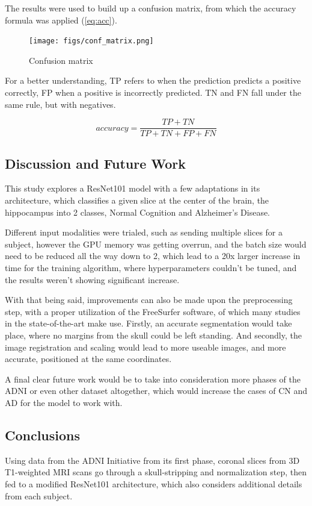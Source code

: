 \documentclass[a4paper, 12pt]{article}
\begin{document}
The results were used to build up a confusion matrix, from which the accuracy formula was applied (\ref{eq:acc}).
\begin{figure}[htbp]
    \centering
    \texttt{[image: figs/conf\_matrix.png]}
    \caption{Confusion matrix}
    \label{fig:confusion matrix}
\end{figure}

For a better understanding, TP refers to when the prediction predicts a positive correctly, FP when a positive is incorrectly
predicted. TN and FN fall under the same rule, but with negatives.

\begin{equation}
    accuracy = \frac{TP + TN}{TP + TN + FP + FN}
    \label{eq:acc}
\end{equation}

\newpage
\subsection{Discussion and Future Work}
This study explores a ResNet101 model with a few adaptations in its architecture, which classifies a given slice at the center of the brain,
the hippocampus into 2 classes, Normal Cognition and Alzheimer's Disease.


Different input modalities were trialed, such as sending multiple slices for a subject, however the GPU memory was getting overrun, and the batch size
would need to be reduced all the way down to 2, which lead to a 20x larger increase in time for the training algorithm, where hyperparameters couldn't
be tuned, and the results weren't showing significant increase.

With that being said, improvements can also be made upon the preprocessing step, with a proper utilization of the FreeSurfer software, of which many
studies in the state-of-the-art make use. Firstly, an accurate segmentation would take place, where no margins from the skull could be left standing.
And secondly, the image registration and scaling would lead to more useable images, and more accurate, positioned at the same coordinates.

A final clear future work would be to take into consideration more phases of the ADNI or even other dataset altogether, which would increase the
cases of CN and AD for the model to work with.
\newpage
\subsection{Conclusions}
Using data from the ADNI Initiative from its first phase, coronal slices from 3D T1-weighted MRI scans go through a skull-stripping and normalization step,
then fed to a modified ResNet101 architecture, which also considers additional details from each subject.
\end{document}
